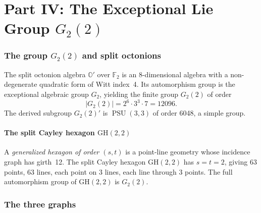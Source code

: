 \documentclass[11pt,a4paper]{article}
\theoremstyle{plain}
\theoremstyle{definition}
\theoremstyle{remark}
\newcommand{\F}{\mathbb{F}}
\newcommand{\PSU}{\operatorname{PSU}}
\newcommand{\GH}{\mathrm{GH}(2,2)}
\begin{document}
%
%

\newpage
\part*{Part IV: The Exceptional Lie Group $G_2(2)$}

\section{The group $G_2(2)$ and split octonions}

The split octonion algebra $\mathbb{O}'$ over $\F_2$ is an 8-dimensional
algebra with a non-degenerate quadratic form of Witt index~4. Its automorphism
group is the exceptional algebraic group $G_2$, yielding the finite group
$G_2(2)$ of order
\[
  |G_2(2)| = 2^6 \cdot 3^3 \cdot 7 = 12096.
\]
The derived subgroup $G_2(2)'$ is $\PSU(3,3)$ of order 6048, a simple group.

\subsection{The split Cayley hexagon $\GH$}

A \emph{generalized hexagon of order $(s,t)$} is a point-line geometry whose
incidence graph has girth~12. The split Cayley hexagon $\GH$ has $s = t = 2$,
giving 63 points, 63 lines, each point on 3 lines, each line through 3 points.
The full automorphism group of $\GH$ is $G_2(2)$.


\section{The three graphs}
\end{document}
